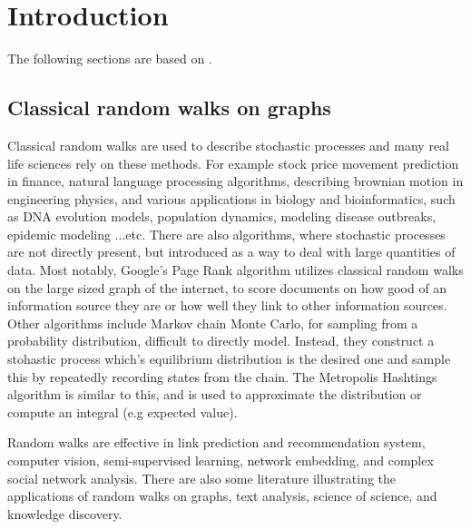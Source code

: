 \chapter{Introduction}


The following sections are based on \cite{XiaReview}.

\section{Classical random walks on graphs}

Classical random walks are used to describe stochastic processes and many real life sciences rely on these methods. For example stock price movement prediction in finance, natural language processing algorithms, describing brownian motion in engineering physics, and various applications in biology and bioinformatics, such as DNA evolution models, population dynamics, modeling disease outbreaks, epidemic modeling ...etc. There are also algorithms, where stochastic processes are not directly present, but introduced as a way to deal with large quantities of data. Most notably, Google's Page Rank algorithm utilizes classical random walks on the large sized graph of the internet, to score documents on how good of an information source they are or how well they link to other information sources. Other algorithms include Markov chain Monte Carlo, for sampling from a probability distribution, difficult to directly model. Instead, they construct a stohastic process which's equilibrium distribution is the desired one and sample this by repeatedly recording states from the chain. The Metropolis Hashtings algorithm is similar to this, and is used to approximate the distribution or compute an integral (e.g expected value).


Random walks are effective in link prediction and recommendation system, computer vision, semi-supervised learning, network embedding, and complex
social network analysis. There are also some literature illustrating the applications of random walks on graphs, text analysis, science of science, and knowledge
discovery.

